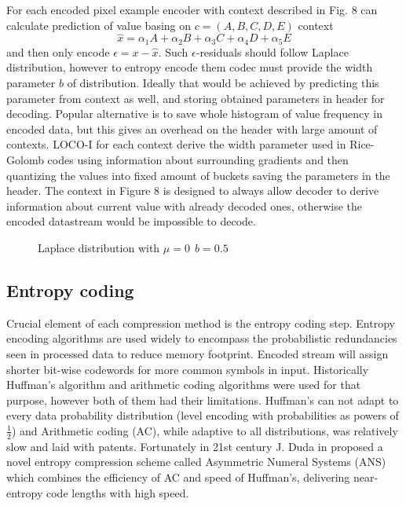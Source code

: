 For each encoded pixel example encoder with context described in Fig. 8 can calculate prediction of value basing on $c = (A,B,C,D,E)$ context
\[
    \widehat{x} = \alpha_1A + \alpha_2B + \alpha_3C + \alpha_4D + \alpha_5E
\] 
and then only encode $\epsilon = x - \widehat{x}$. Such $\epsilon$-residuals should follow Laplace
distribution, however to entropy encode them codec must provide the width parameter $b$ of distribution.
Ideally that would be achieved by predicting this parameter from context as well, and storing obtained
parameters in header for decoding. Popular alternative is to save whole histogram of value frequency
in encoded data, but this gives an overhead on the header with large amount of contexts. LOCO-I for 
each context derive the width parameter used in Rice-Golomb codes\cite{weinberger1996LOCO} using information about 
surrounding gradients and then quantizing the values into fixed amount of buckets saving the parameters
in the header. The context in Figure 8 is designed to always allow decoder to derive information about
current value with already decoded ones, otherwise the encoded datastream would be impossible to decode.
\begin{figure}
    \centering
    \caption{Laplace distribution with $\mu = 0 \ \ b = 0.5$}
\end{figure}


\subsection{Entropy coding}
Crucial element of each compression method is the entropy coding step. Entropy encoding algorithms are used widely
to encompass the probabilistic redundancies seen in processed data to reduce memory footprint. Encoded stream will assign
shorter bit-wise codewords for more common symbols in input. Historically Huffman's algorithm and arithmetic coding algorithms
were used for that purpose, however both of them had their limitations. Huffman's can not adapt to every 
data probability distribution (level encoding with probabilities as powers of $\frac{1}{2}$) and Arithmetic
coding (AC), while adaptive to all distributions, was relatively slow and laid with patents. Fortunately in 21st century
J. Duda  in \cite{duda2009ans} proposed a novel entropy compression scheme called Asymmetric Numeral Systems (ANS) which combines the 
efficiency of AC and speed of Huffman's, delivering near-entropy code lengths with high speed.

